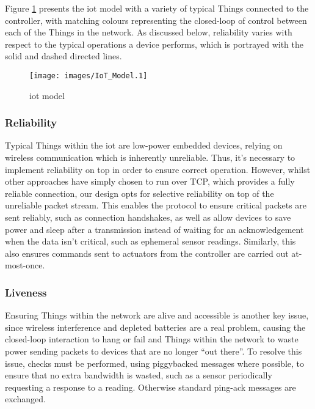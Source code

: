 \documentclass{mpaper}
\begin{document}
Figure \ref{fig:model} presents the iot model with a variety of typical Things connected to the controller, with matching colours representing the closed-loop of control between each of the Things in the network. As discussed below, reliability varies with respect to the typical operations a device performs, which is portrayed with the solid and dashed directed lines.

\begin{figure}[ht!]
\begin{center}
  \texttt{[image: images/IoT\_Model.1]}
\caption{iot model}
\label{fig:model}
\end{center}
\end{figure}

\subsubsection*{Reliability} %
\label{ssub:reliability}
Typical Things within the iot are low-power embedded devices, relying on wireless communication which is inherently unreliable. Thus, it's necessary to implement reliability on top in order to ensure correct operation. However, whilst other approaches have simply chosen to run over TCP, which provides a fully reliable connection, our design opts for selective reliability on top of the unreliable packet stream. This enables the protocol to ensure critical packets are sent reliably, such as connection handshakes, as well as allow devices to save power and sleep after a transmission instead of waiting for an acknowledgement when the data isn't critical, such as ephemeral sensor readings. Similarly, this also ensures commands sent to actuators from the controller are carried out at-most-once.

\subsubsection*{Liveness} %
\label{ssub:liveness}
Ensuring Things within the network are alive and accessible is another key issue, since wireless interference and depleted batteries are a real problem, causing the closed-loop interaction to hang or fail and Things within the network to waste power sending packets to devices that are no longer ``out there''. To resolve this issue, checks must be performed, using piggybacked messages where possible, to ensure that no extra bandwidth is wasted, such as a sensor periodically requesting a response to a reading. Otherwise standard ping-ack messages are exchanged.
\end{document}
